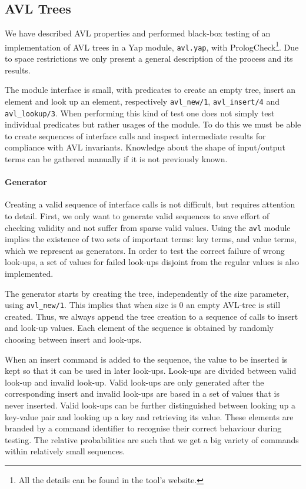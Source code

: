 \documentclass[runningheads,a4paper]{../../PaperStyles/llncs}
\newcommand{\yap}[1]{\lstinline[style=yap]{#1}}
\newcommand{\Yap}[0]{{\sf Yap}}
\newcommand{\plqc}[0]{{\sf PrologCheck}}
\begin{document}

\subsection{AVL Trees}

We have described AVL properties and performed black-box testing of an
implementation of AVL trees in a \Yap{} module, \yap{avl.yap}, with
\plqc{}\footnote{All the details can be found in the tool's website.}.
Due to space restrictions we only present a general description of the
process and its results. 


The module interface is small, with predicates to create an empty
tree, insert an element and look up an element, respectively
\yap{avl_new/1}, \yap{avl_insert/4} and \yap{avl_lookup/3}.
%
When performing this kind of test one does not simply test individual
predicates but rather usages of the module.
%
To do this we must be able to create sequences of interface
calls and inspect intermediate results for compliance with AVL
invariants.
%
Knowledge about the shape of input/output terms can be gathered manually
if it is not previously known.


\paragraph{\bf Generator}

Creating a valid sequence of interface calls is not difficult, but
requires attention to detail.
%
First, we only want to generate valid sequences to save effort of
checking validity and not suffer from sparse valid values.
%
Using the \yap{avl} module implies the existence of two sets of important
terms: key terms, and value terms, which we represent as generators.
%
In order to test the correct failure of wrong look-ups, a set of values
for failed look-ups disjoint from the regular values is also
implemented.


The generator starts by creating the tree, independently of the
size parameter, using \yap{avl_new/1}.
%
This implies that when size is 0 an empty AVL-tree is still created.
%
Thus, we always append the tree creation to a sequence of calls to
insert and look-up values.
%
Each element of the sequence is obtained by randomly choosing between
insert and look-ups.


When an insert command is added to the sequence, the value to be
inserted is kept so that it can be used in later look-ups.
%
Look-ups are divided between valid look-up and invalid look-up.
%
Valid look-ups are only generated after the corresponding insert and
invalid look-ups are based in a set of values that is never inserted.
%
Valid look-ups can be further distinguished between looking up a
key-value pair and looking up a key and retrieving its value.
%
These elements are  branded by a command identifier to recognise their
correct behaviour during testing.
%
The relative probabilities are such that we get a big variety of commands within
relatively small sequences.
\end{document}
